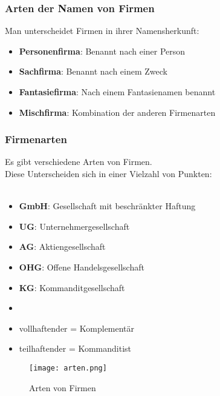 \documentclass[asp1.tex]{subfiles}
\begin{document}
\subsubsection{Arten der Namen von Firmen}
Man unterscheidet Firmen in ihrer Namensherkunft:
\begin{itemize}
    \item \textbf{Personenfirma}: Benannt nach einer Person
    \item \textbf{Sachfirma}: Benannt nach einem Zweck
    \item \textbf{Fantasiefirma}: Nach einem Fantasienamen benannt
    \item \textbf{Mischfirma}: Kombination der anderen Firmenarten
\end{itemize}

\subsubsection{Firmenarten}
Es gibt verschiedene Arten von Firmen. \\
Diese Unterscheiden sich in einer Vielzahl von Punkten: \\ \\

\begin{itemize}
    \item \textbf{GmbH}: Gesellschaft mit beschr\"ankter Haftung
    \item \textbf{UG}: Unternehmergesellschaft
    \item \textbf{AG}: Aktiengesellschaft
    \item \textbf{OHG}: Offene Handelsgesellschaft
    \item \textbf{KG}: Kommanditgesellschaft
    \item[]
    \item vollhaftender = Komplement\"ar
    \item teilhaftender = Kommanditist
\end{itemize}

\begin{figure}[H]
    \begin{center}
        \texttt{[image: arten.png]}
    \end{center}
    \caption{Arten von Firmen}
    \label{fig: Arten von Firmen}
\end{figure}
\end{document}
